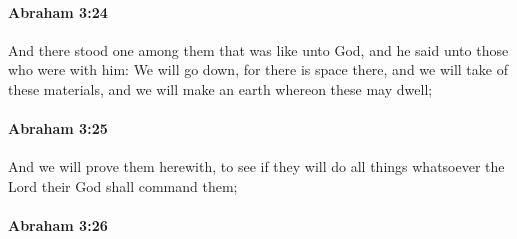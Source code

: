 		\paragraph{Abraham 3:24} %
			\label{ABRAHAM-3-24}

			And there stood one among them that was like unto God, and he said unto those who were with him: We will go down, for there is space there, and we will take of these materials, and we will make an earth whereon these may dwell;


		\paragraph{Abraham 3:25} %
			\label{ABRAHAM-3-25}

			And we will prove them herewith, to see if they will do all things whatsoever the Lord their God shall command them;


		\paragraph{Abraham 3:26} %
			\label{ABRAHAM-3-26}

